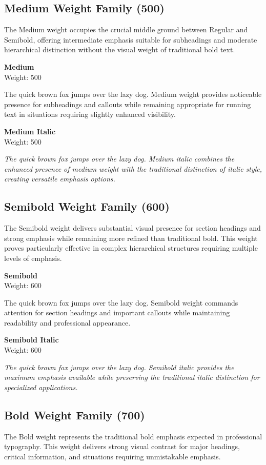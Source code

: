 \documentclass[11pt,letterpaper]{article}
\newcommand{\weightdemo}[3]{%
\noindent
\begin{minipage}{0.25\textwidth}
\textbf{#1}\\
{\small Weight: #2}
\end{minipage}%
\begin{minipage}{0.75\textwidth}
#3
\end{minipage}
\vspace{0.5em}
}
\begin{document}
\subsection{Medium Weight Family (500)}

The Medium weight occupies the crucial middle ground between Regular and Semibold, offering intermediate emphasis suitable for subheadings and moderate hierarchical distinction without the visual weight of traditional bold text.

\weightdemo{Medium}{500}{%
{\mediumfont The quick brown fox jumps over the lazy dog. Medium weight provides noticeable presence for subheadings and callouts while remaining appropriate for running text in situations requiring slightly enhanced visibility.}
}

\weightdemo{Medium Italic}{500}{%
{\mediumfont\itshape The quick brown fox jumps over the lazy dog. Medium italic combines the enhanced presence of medium weight with the traditional distinction of italic style, creating versatile emphasis options.}
}

\subsection{Semibold Weight Family (600)}

The Semibold weight delivers substantial visual presence for section headings and strong emphasis while remaining more refined than traditional bold. This weight proves particularly effective in complex hierarchical structures requiring multiple levels of emphasis.

\weightdemo{Semibold}{600}{%
{\semiboldfont The quick brown fox jumps over the lazy dog. Semibold weight commands attention for section headings and important callouts while maintaining readability and professional appearance.}
}

\weightdemo{Semibold Italic}{600}{%
{\semiboldfont\itshape The quick brown fox jumps over the lazy dog. Semibold italic provides the maximum emphasis available while preserving the traditional italic distinction for specialized applications.}
}

\subsection{Bold Weight Family (700)}

The Bold weight represents the traditional bold emphasis expected in professional typography. This weight delivers strong visual contrast for major headings, critical information, and situations requiring unmistakable emphasis.
\end{document}
